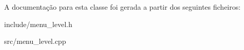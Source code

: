 A documentação para esta classe foi gerada a partir dos seguintes ficheiros\+:\begin{DoxyCompactItemize}
\item 
include/menu\+\_\+level.\+h\item 
src/menu\+\_\+level.\+cpp\end{DoxyCompactItemize}
